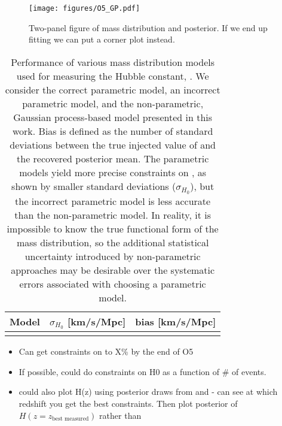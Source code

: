 \documentclass[]{aastex631}
\begin{document}
\begin{figure}
    \centering
    \texttt{[image: figures/O5\_GP.pdf]}
    \caption{Two-panel figure of mass distribution and \Ho{} posterior. If we end up fitting \Omm{} we can put a corner plot instead.}
    \label{fig:O5_GP}
\end{figure}


\begin{table}[]
    \centering
    \begin{tabular}{c|c c}
         Model & $\sigma_{H_0}$ [km/s/Mpc] & bias [km/s/Mpc]\\
         \hline
         & 
    \end{tabular}
    \caption{Performance of various mass distribution models used for measuring the Hubble constant, \Ho.
    We consider the correct parametric model, an incorrect parametric model, and the non-parametric, Gaussian process-based model presented in this work.
    Bias is defined as the number of standard deviations between the true injected value of \Ho and the recovered posterior mean. 
    The parametric models yield more precise constraints on \Ho{}, as shown by smaller standard deviations ($\sigma_{H_0}$), but the incorrect parametric model is less accurate than the non-parametric model.
    In reality, it is impossible to know the true functional form of the mass distribution, so the additional statistical uncertainty introduced by non-parametric approaches may be desirable over the systematic errors associated with choosing a parametric model.
    }
    \label{tab:bias}
\end{table}

\begin{itemize}
    \item Can get constraints on \Ho{} to X\% by the end of O5
    \item If possible, could do constraints on H0 as a function of \# of events.
    \item could also plot H(z) using posterior draws from \Ho{} and \Omm{}- can see at which redshift you get the best constraints. Then plot posterior of $H(z=z_{\text{best measured}})$ rather than \Ho {}
\end{itemize}
\end{document}

